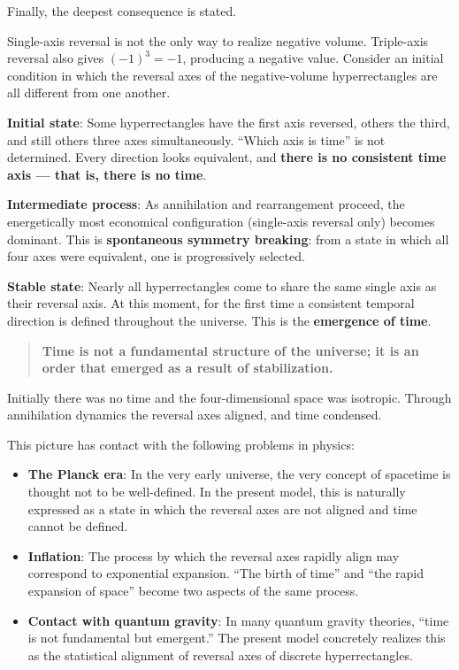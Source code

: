 \documentclass[a4paper,11pt]{article}
\theoremstyle{definition}
\providecommand{\tightlist}{\setlength{\itemsep}{0pt}\setlength{\parskip}{0pt}}
\begin{document}
Finally, the deepest consequence is stated.

Single-axis reversal is not the only way to realize negative volume.
Triple-axis reversal also gives \((-1)^3 = -1\), producing a negative
value. Consider an initial condition in which the reversal axes of the
negative-volume hyperrectangles are all different from one another.

\textbf{Initial state}: Some hyperrectangles have the first axis
reversed, others the third, and still others three axes simultaneously.
``Which axis is time'' is not determined. Every direction looks
equivalent, and \textbf{there is no consistent time axis --- that is,
there is no time}.

\textbf{Intermediate process}: As annihilation and rearrangement
proceed, the energetically most economical configuration (single-axis
reversal only) becomes dominant. This is \textbf{spontaneous symmetry
breaking}: from a state in which all four axes were equivalent, one is
progressively selected.

\textbf{Stable state}: Nearly all hyperrectangles come to share the same
single axis as their reversal axis. At this moment, for the first time a
consistent temporal direction is defined throughout the universe. This
is the \textbf{emergence of time}.

\begin{quote}
\textbf{Time is not a fundamental structure of the universe; it is an
order that emerged as a result of stabilization.}
\end{quote}

Initially there was no time and the four-dimensional space was
isotropic. Through annihilation dynamics the reversal axes aligned, and
time condensed.

This picture has contact with the following problems in physics:

\begin{itemize}
\tightlist
\item
  \textbf{The Planck era}: In the very early universe, the very concept
  of spacetime is thought not to be well-defined. In the present model,
  this is naturally expressed as a state in which the reversal axes are
  not aligned and time cannot be defined.
\item
  \textbf{Inflation}: The process by which the reversal axes rapidly
  align may correspond to exponential expansion. ``The birth of time''
  and ``the rapid expansion of space'' become two aspects of the same
  process.
\item
  \textbf{Contact with quantum gravity}: In many quantum gravity
  theories, ``time is not fundamental but emergent.'' The present model
  concretely realizes this as the statistical alignment of reversal axes
  of discrete hyperrectangles.
\end{itemize}
\end{document}
